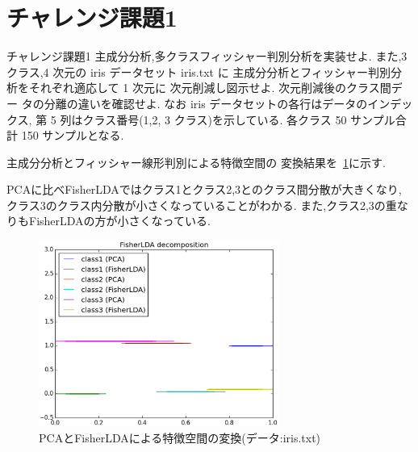 \section{チャレンジ課題1}\label{section:challenge1}
\begin{itembox}{チャレンジ課題1}
  主成分分析,多クラスフィッシャー判別分析を実装せよ.
  また,3 クラス,4 次元の iris データセット iris.txt に
  主成分分析とフィッシャー判別分析をそれぞれ適応して 1 次元に
  次元削減し図示せよ.
  次元削減後のクラス間デー タの分離の違いを確認せよ.
  なお iris データセットの各行はデータのインデックス,
  第 5 列はクラス番号(1,2, 3 クラス)を示している.
  各クラス 50 サンプル合計 150 サンプルとなる.
\end{itembox}

主成分分析とフィッシャー線形判別による特徴空間の
変換結果を~\ref{fig:challenge1}に示す.

PCAに比べFisherLDAではクラス1とクラス2,3とのクラス間分散が大きくなり,
クラス3のクラス内分散が小さくなっていることがわかる.
また,クラス2,3の重なりもFisherLDAの方が小さくなっている.


\begin{figure}[htbp]
  \centering
  \includegraphics[width=0.7\textwidth]{./assets/challenge1_plot_20150210_045103.eps}
  \caption{PCAとFisherLDAによる特徴空間の変換(データ:iris.txt)}
  \label{fig:challenge1}
\end{figure}